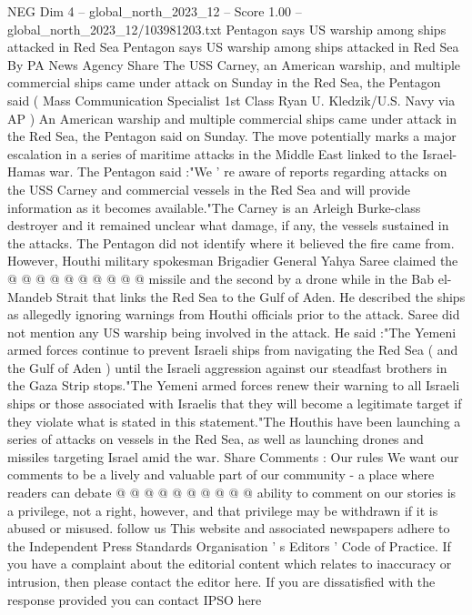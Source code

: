 \begin{textsample}{NEG Dim 4 – global\_north\_2023\_12 – Score 1.00 – global\_north\_2023\_12/103981203.txt}  \label{ex:f4_neg_146}
Pentagon says US warship among ships attacked in Red Sea Pentagon says US warship among ships attacked in Red Sea By PA News Agency Share The USS Carney, an American warship, and multiple commercial ships came under attack on Sunday in the Red Sea, the Pentagon said ( Mass Communication Specialist 1st Class Ryan U.
Kledzik/U.S.
Navy via AP ) An American warship and multiple commercial ships came under attack in the Red Sea, the Pentagon said on Sunday.
The move potentially marks a major escalation in a series of maritime attacks in the Middle East linked to the Israel-Hamas war.
The Pentagon said :"We ' re aware of reports regarding attacks on the USS Carney and commercial vessels in the Red Sea and will provide information as it becomes available."The Carney is an Arleigh Burke-class destroyer and it remained unclear what damage, if any, the vessels sustained in the attacks.
The Pentagon did not identify where it believed the fire came from.
However, Houthi military spokesman Brigadier General Yahya Saree claimed the @ @ @ @ @ @ @ @ @ @ missile and the second by a drone while in the Bab el-Mandeb Strait that links the Red Sea to the Gulf of Aden.
He described the ships as allegedly ignoring warnings from Houthi officials prior to the attack.
Saree did not mention any US warship being involved in the attack.
He said :"The Yemeni armed forces continue to prevent Israeli ships from navigating the Red Sea ( and the Gulf of Aden ) until the Israeli aggression against our steadfast brothers in the Gaza Strip stops."The Yemeni armed forces renew their warning to all Israeli ships or those associated with Israelis that they will become a legitimate target if they violate what is stated in this statement."The Houthis have been launching a series of attacks on vessels in the Red Sea, as well as launching drones and missiles targeting Israel amid the war.
Share Comments : Our rules We want our comments to be a lively and valuable part of our community - a place where readers can debate @ @ @ @ @ @ @ @ @ @ ability to comment on our stories is a privilege, not a right, however, and that privilege may be withdrawn if it is abused or misused. follow us This website and associated newspapers adhere to the Independent Press Standards Organisation ' s Editors ' Code of Practice.
If you have a complaint about the editorial content which relates to inaccuracy or intrusion, then please contact the editor here.
If you are dissatisfied with the response provided you can contact IPSO here

\end{textsample}
